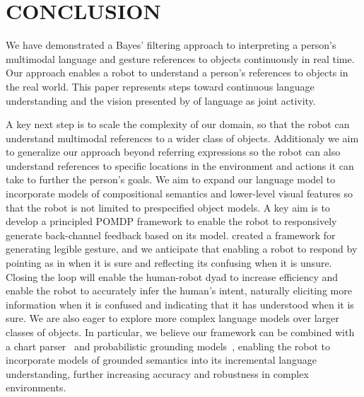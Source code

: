 \documentclass[letterpaper, 10 pt, conference]{ieeeconf}
\begin{document}
\section{CONCLUSION}

We have demonstrated a Bayes' filtering approach to interpreting a
person's multimodal language and gesture references to objects
continuously in real time.  Our approach enables a robot to understand
a person's references to objects in the real world.  This paper
represents steps toward continuous language understanding and the
vision presented by \citet{clark96} of language as joint activity.

A key next step is to scale the complexity of our domain, so that the
robot can understand multimodal references to a wider class of
objects.  Additionaly we aim to generalize our approach beyond
referring expressions so the robot can also understand references to
specific locations in the environment and actions it can take to
further the person's goals.  We aim to expand our language model to
incorporate models of compositional semantics and lower-level visual
features so that the robot is not limited to prespecified object
models.  A key aim is to develop a principled POMDP framework to
enable the robot to responsively generate back-channel feedback based
on its model.  \citet{dragan13} created a framework for generating
legible gesture, and we anticipate that enabling a robot to respond by
pointing as in \citet{holladay14} when it is sure and reflecting its
confusing when it is unsure.  Closing the loop will enable the
human-robot dyad to increase efficiency and enable the robot to
accurately infer the human's intent, naturally eliciting more
information when it is confused and indicating that it has understood
when it is sure.  We are also eager to explore more complex language
models over larger classes of objects.  In particular, we believe our
framework can be combined with a chart parser~\citep{earley70,
  jurafsky95} and probabilistic grounding models~\citep{tellex11},
enabling the robot to incorporate models of grounded semantics into
its incremental language understanding, further increasing accuracy
and robustness in complex environments.




\end{document}
